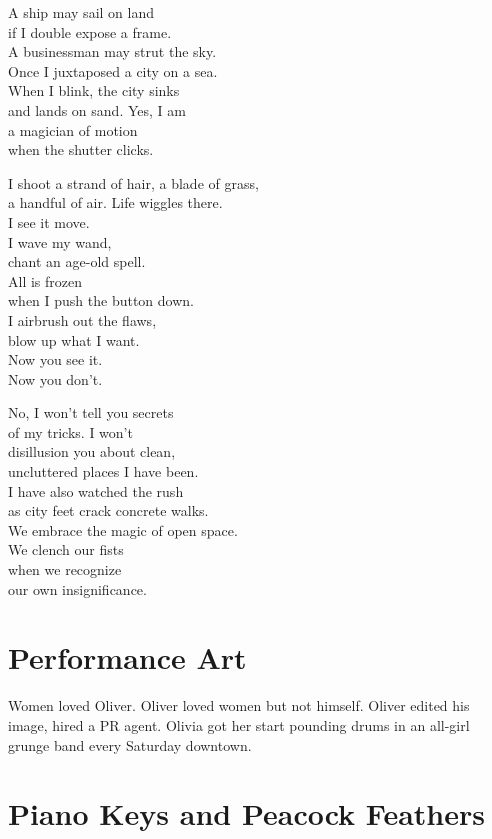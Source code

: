 \documentclass[twoside,10pt]{book}
\begin{document}
A ship may sail on land\\
if I double expose a frame.\\
A businessman may strut the sky.\\
Once I juxtaposed a city on a sea.\\
When I blink, the city sinks\\
and lands on sand. Yes, I am\\
a magician of motion\\
when the shutter clicks.

I shoot a strand of hair, a blade of grass,\\
a handful of air. Life wiggles there.\\
I see it move.\\
I wave my wand,\\
chant an age-old spell.\\
All is frozen\\
when I push the button down.\\
I airbrush out the flaws,\\
blow up what I want.\\
Now you see it.\\
Now you don't.

No, I won't tell you secrets\\
of my tricks. I won't\\
disillusion you about clean,\\
uncluttered places I have been.\\
I have also watched the rush\\
as city feet crack concrete walks.\\
We embrace the magic of open space.\\
We clench our fists\\
when we recognize\\
our own insignificance.


\clearpage
\section{Performance Art}

Women loved Oliver. Oliver loved women but not himself. Oliver edited
his image, hired a PR agent. Olivia got her start pounding drums in an
all-girl grunge band every Saturday downtown.


\clearpage
\section{Piano Keys and Peacock Feathers}
\end{document}
